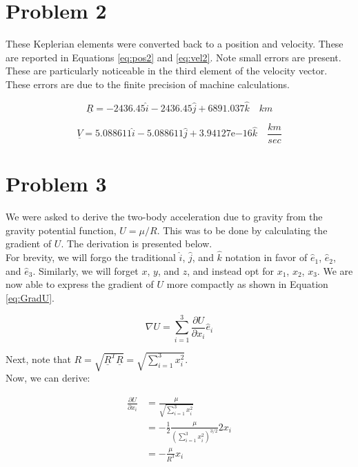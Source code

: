 \documentclass[11pt]{article}
\begin{document}
\section{Problem 2}

These Keplerian elements were converted back to a position and velocity. These are reported in Equations \eqref{eq:pos2} and \eqref{eq:vel2}. Note small errors are present. These are particularly noticeable in the third element of the velocity vector. These errors are due to the finite precision of machine calculations.

\begin{equation}
\label{eq:pos2}
\underline{R} = -2436.45\hat{i} - 2436.45\hat{j} + 6891.037\hat{k} \quad km
\end{equation}

\begin{equation}
\label{eq:vel2}
\underline{V} = 5.088611\hat{i} - 5.088611\hat{j} + 3.94127\mathrm{e}{-16}\hat{k}  \quad \frac{km}{sec}
\end{equation}

\section{Problem 3}

We were asked to derive the two-body acceleration due to gravity from the gravity potential function, $U = \mu/R$. This was to be done by calculating the gradient of $U$. The derivation is presented below. \\

For brevity, we will forgo the traditional $\hat{i}$, $\hat{j}$, and $\hat{k}$ notation in favor of $\hat{e}_1$, $\hat{e}_2$, and $\hat{e}_3$. Similarly, we will forget $x$, $y$, and $z$, and instead opt for $x_1$, $x_2$, $x_3$. We are now able to express the gradient of $U$ more compactly as shown in Equation \eqref{eq:GradU}.

\begin{equation}
	\label{eq:GradU}
	\nabla U = \sum_{i = 1}^{3} \frac{\partial U}{\partial x_i} \hat{e}_i
\end{equation}

Next, note that $R = \sqrt{\underline{R}^T \underline{R}} = \sqrt{\sum_{i = 1}^{3} x_i^2}$. \\

Now, we can derive:

\begin{align}
	\frac{\partial U}{\partial x_i} & = \frac{\mu}{\sqrt{\sum_{i = 1}^{3} x_i^2}} \\
	& = -\frac{1}{2} \frac{\mu}{\left(\sum_{i = 1}^{3} x_i^2 \right) ^ {3/2}} 2 x_i \\
	& = - \frac{\mu}{R^3} x_i
\end{align}
\end{document}
